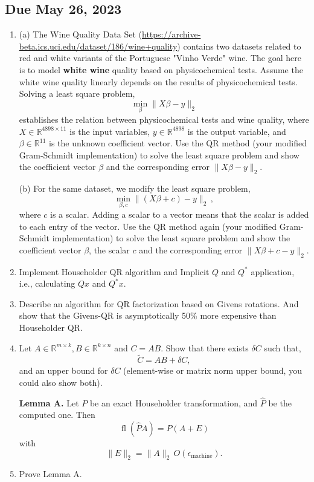 \subsection*{Due May 26, 2023}
\begin{enumerate}[label=\textbf{Problem \arabic*.}]
    \item [20 pt] (a) The Wine Quality Data Set (\url{https://archive-beta.ics.uci.edu/dataset/186/wine+quality}) contains two datasets related to red and white variants of the Portuguese "Vinho Verde" wine. The goal here is to model \textbf{white wine} quality based on physicochemical tests. Assume the white wine quality linearly depends on the results of physicochemical tests. Solving a least square problem,
    \[\min_{\beta}\|X\beta-y\|_{2}\]
    establishes the relation between physicochemical tests and wine quality, where \(X\in\mathbb{R}^{4898\times 11}\) is the input variables, \(y\in\mathbb{R}^{4898}\) is the output variable, and \(\beta\in\mathbb{R}^{11}\) is the unknown coefficient vector. Use the QR method (your modified Gram-Schmidt implementation) to solve the least square problem and show the coefficient vector \(\beta\) and the corresponding error \(\|X\beta-y\|_{2}\).

    (b) For the same dataset, we modify the least square problem,
    \[\min_{\beta,c}\|(X\beta+c)-y\|_{2}\,,\]
    where \(c\) is a scalar. Adding a scalar to a vector means that the scalar is added to each entry of the vector. Use the QR method again (your modified Gram-Schmidt implementation) to solve the least square problem and show the coefficient vector \(\beta\), the scalar \(c\) and the corresponding error \(\|X\beta+c-y\|_{2}\).
    \item [15 pt] Implement Householder QR algorithm and Implicit \(Q\) and \(Q^{*}\) application, i.e., calculating \(Qx\) and \(Q^{*}x\).
    \item [15 pt] Describe an algorithm for QR factorization based on Givens rotations. And show that the Givens-QR is asymptotically 50\% more expensive than Householder QR.
    \item [20 pt] Let \(A\in\mathbb{R}^{m\times k},B\in\mathbb{R}^{k\times n}\) and \(C=AB\). Show that there exists \(\delta C\) such that,
    \[\widetilde{C}=AB+\delta C,\]
    and an upper bound for \(\delta C\) (element-wise or matrix norm upper bound, you could also show both).
    
    \textbf{Lemma A.} Let \(P\) be an exact Householder transformation, and \(\widehat{P}\) be the computed one. Then
    \[\operatorname{\text{fl}}(\widehat{P}A)=P(A+E)\]
    with
    \[\|E\|_{2}=\|A\|_{2}\,O(\epsilon_{\text{machine}}).\]
    \item [20 pt] Prove Lemma A.
\end{enumerate}

